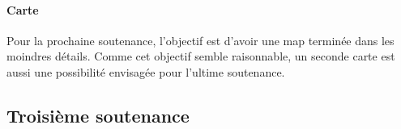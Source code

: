        \paragraph{Carte}

        Pour la prochaine soutenance, l'objectif est d'avoir une map terminée dans les moindres 
        détails. Comme cet objectif semble raisonnable, un seconde carte est aussi une possibilité 
        envisagée pour l'ultime soutenance.

    
    \subsection{Troisième soutenance}


